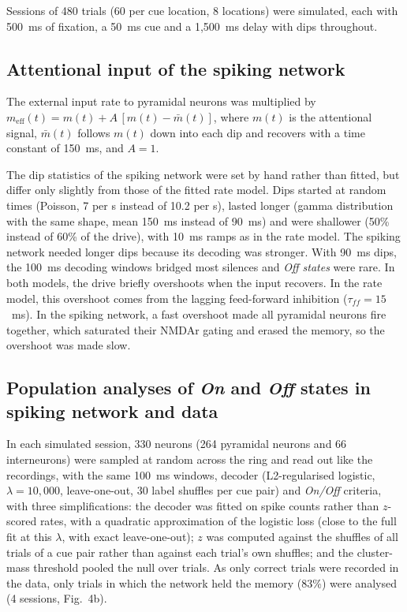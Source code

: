 \documentclass[11pt]{article}
\begin{document}
Sessions of 480 trials (60 per cue location, 8 locations) were simulated, each with 500~ms of fixation, a 50~ms cue and a 1,500~ms delay with dips throughout.

\subsection{Attentional input of the spiking network}

The external input rate to pyramidal neurons was multiplied by $m_\mathrm{eff}(t) = m(t) + A\,[m(t) - \bar m(t)]$, where $m(t)$ is the attentional signal, $\bar m(t)$ follows $m(t)$ down into each dip and recovers with a time constant of 150~ms, and $A = 1$.

The dip statistics of the spiking network were set by hand rather than fitted, but differ only slightly from those of the fitted rate model. Dips started at random times (Poisson, 7 per s instead of 10.2 per s), lasted longer (gamma distribution with the same shape, mean 150~ms instead of 90~ms) and were shallower (50\% instead of 60\% of the drive), with 10~ms ramps as in the rate model. The spiking network needed longer dips because its decoding was stronger. With 90~ms dips, the 100~ms decoding windows bridged most silences and \emph{Off states} were rare. In both models, the drive briefly overshoots when the input recovers. In the rate model, this overshoot comes from the lagging feed-forward inhibition ($\tau_{\mathit{ff}} = 15$~ms). In the spiking network, a fast overshoot made all pyramidal neurons fire together, which saturated their NMDAr gating and erased the memory, so the overshoot was made slow.

\subsection{Population analyses of \emph{On} and \emph{Off} states in spiking network and data}

In each simulated session, 330 neurons (264 pyramidal neurons and 66 interneurons) were sampled at random across the ring and read out like the recordings, with the same 100~ms windows, decoder (L2-regularised logistic, $\lambda = 10{,}000$, leave-one-out, 30 label shuffles per cue pair) and \emph{On/Off} criteria, with three simplifications: the decoder was fitted on spike counts rather than $z$-scored rates, with a quadratic approximation of the logistic loss (close to the full fit at this $\lambda$, with exact leave-one-out); $z$ was computed against the shuffles of all trials of a cue pair rather than against each trial's own shuffles; and the cluster-mass threshold pooled the null over trials. As only correct trials were recorded in the data, only trials in which the network held the memory (83\%) were analysed (4 sessions, Fig.~4b).
\end{document}
